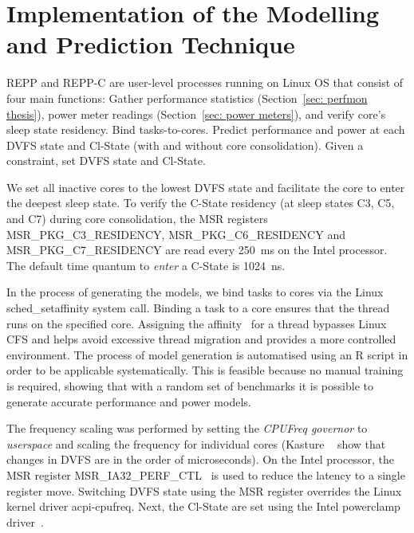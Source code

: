 \section{Implementation of the Modelling and Prediction Technique}%
\label{subsec: implementation-REPPC}


REPP and REPP-C are user-level processes running on Linux OS that consist of four main
functions: {\small {}} Gather performance statistics (Section~\ref{sec: perfmon
thesis}), power meter readings (Section~\ref{sec: power meters}), and verify core's sleep
state residency.  {\small {}} Bind tasks-to-cores.  {\small {}} Predict
performance and power at each DVFS state and Cl-State (with and without core
consolidation).  {\small {}} Given a constraint, set DVFS state and Cl-State.  

 We set all inactive cores to the lowest DVFS state and facilitate the core to enter the
deepest sleep state. To verify the C-State residency (at sleep states \textsf{C3},
\textsf{C5}, and \textsf{C7}) during core consolidation, the MSR registers~\citep{Intel}
\textsf{MSR\_PKG\_C3\_RESIDENCY}, \textsf{MSR\_PKG\_C6\_RESIDENCY} and
\textsf{MSR\_PKG\_C7\_RES\-}\textsf{IDENCY} are read every
\SI{250}{\milli\second} on the Intel processor. The default time quantum to \textsl{enter}
a C-State is \SI{1024}{\nano\second}.

 In the process of generating the models, we bind tasks to cores via the
Linux \textsf{sched\_setaffinity} system call. Binding a task to a core ensures that the
thread runs on the specified core. Assigning the affinity~\citep{LinuxKernel} for a thread
bypasses Linux CFS and helps avoid excessive thread migration and provides a more controlled
environment.  The process of model generation is automatised using an R script in order to
be applicable systematically. This is feasible because no manual training is required,
showing that with a random set of benchmarks it is possible to generate accurate
performance and power models. 

The frequency scaling was performed by setting the \textit{CPUFreq governor} to
\textit{userspace} and scaling the frequency for individual cores (Kasture
\etal~\citep{Kasture2015Rubik} show that changes in DVFS are in the order of
microseconds). On the Intel processor, the MSR register
\textsf{MSR\_IA32\_PERF\_CTL}~\citep{acpikernel, Intel} is used to reduce the latency to a
single register move. Switching DVFS state using the MSR register overrides the Linux
kernel driver \textsf{acpi-cpufreq}. Next, the Cl-State are set using the Intel powerclamp
driver~\citep{powerclamp}.   


